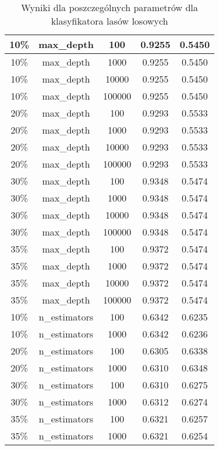 \documentclass{classrep}
\begin{document}
{{{\begin{table}[!htbp]
\begin{tabular}{|c|c|c|c|c|}
10\% & max\_depth & 100 & 0.9255 & 0.5450 \\ \hline
10\% & max\_depth & 1000 & 0.9255 & 0.5450 \\ \hline
10\% & max\_depth & 10000 & 0.9255 & 0.5450 \\ \hline
10\% & max\_depth & 100000 & 0.9255 & 0.5450 \\ \hline
20\% & max\_depth & 100 & 0.9293 & 0.5533 \\ \hline
20\% & max\_depth & 1000 & 0.9293 & 0.5533 \\ \hline
20\% & max\_depth & 10000 & 0.9293 & 0.5533 \\ \hline
20\% & max\_depth & 100000 & 0.9293 & 0.5533 \\ \hline
30\% & max\_depth & 100 & 0.9348 & 0.5474 \\ \hline
30\% & max\_depth & 1000 & 0.9348 & 0.5474 \\ \hline
30\% & max\_depth & 10000 & 0.9348 & 0.5474 \\ \hline
30\% & max\_depth & 100000 & 0.9348 & 0.5474 \\ \hline
35\% & max\_depth & 100 & 0.9372 & 0.5474 \\ \hline
35\% & max\_depth & 1000 & 0.9372 & 0.5474 \\ \hline
35\% & max\_depth & 10000 & 0.9372 & 0.5474 \\ \hline
35\% & max\_depth & 100000 & 0.9372 & 0.5474 \\ \hline
10\% & n\_estimators & 100 & 0.6342 & 0.6235 \\ \hline
10\% & n\_estimators & 1000 & 0.6342 & 0.6236 \\ \hline
20\% & n\_estimators & 100 & 0.6305 & 0.6338 \\ \hline
20\% & n\_estimators & 1000 & 0.6310 & 0.6348 \\ \hline
30\% & n\_estimators & 100 & 0.6310 & 0.6275 \\ \hline
30\% & n\_estimators & 1000 & 0.6312 & 0.6274 \\ \hline
35\% & n\_estimators & 100 & 0.6321 & 0.6257 \\ \hline
35\% & n\_estimators & 1000 & 0.6321 & 0.6254 \\ \hline
\end{tabular}
                \caption{Wyniki dla poszczególnych parametrów dla klasyfikatora lasów losowych}
                \label{tab:params_forest_1}
            \end{table}
            \begin{table}[!htbp]
                \begin{tabular}{|c|c|c|c|c|}

\end{tabular}
\end{table}}}}
\end{document}
